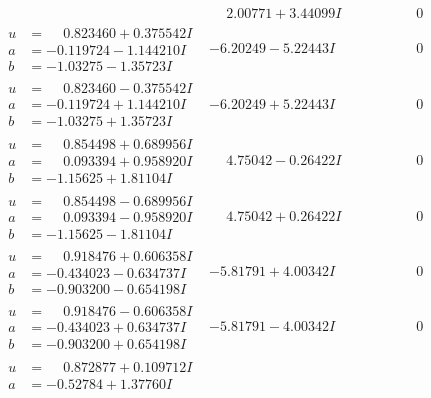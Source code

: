 \documentclass[1p]{elsarticle_modified}
\theoremstyle{definition}
\begin{document}
$$\begin{array}{c|c|c}
 & \phantom{-}2.00771 + 3.44099 I & \phantom{-0.000000 } 0 \\ \hline\begin{aligned}
u &= \phantom{-}0.823460 + 0.375542 I \\
a &= -0.119724 - 1.144210 I \\
b &= -1.03275 - 1.35723 I\end{aligned}
 & -6.20249 - 5.22443 I & \phantom{-0.000000 } 0 \\ \hline\begin{aligned}
u &= \phantom{-}0.823460 - 0.375542 I \\
a &= -0.119724 + 1.144210 I \\
b &= -1.03275 + 1.35723 I\end{aligned}
 & -6.20249 + 5.22443 I & \phantom{-0.000000 } 0 \\ \hline\begin{aligned}
u &= \phantom{-}0.854498 + 0.689956 I \\
a &= \phantom{-}0.093394 + 0.958920 I \\
b &= -1.15625 + 1.81104 I\end{aligned}
 & \phantom{-}4.75042 - 0.26422 I & \phantom{-0.000000 } 0 \\ \hline\begin{aligned}
u &= \phantom{-}0.854498 - 0.689956 I \\
a &= \phantom{-}0.093394 - 0.958920 I \\
b &= -1.15625 - 1.81104 I\end{aligned}
 & \phantom{-}4.75042 + 0.26422 I & \phantom{-0.000000 } 0 \\ \hline\begin{aligned}
u &= \phantom{-}0.918476 + 0.606358 I \\
a &= -0.434023 - 0.634737 I \\
b &= -0.903200 - 0.654198 I\end{aligned}
 & -5.81791 + 4.00342 I & \phantom{-0.000000 } 0 \\ \hline\begin{aligned}
u &= \phantom{-}0.918476 - 0.606358 I \\
a &= -0.434023 + 0.634737 I \\
b &= -0.903200 + 0.654198 I\end{aligned}
 & -5.81791 - 4.00342 I & \phantom{-0.000000 } 0 \\ \hline\begin{aligned}
u &= \phantom{-}0.872877 + 0.109712 I \\
a &= -0.52784 + 1.37760 I \\

\end{aligned}
\end{array}$$
\end{document}
